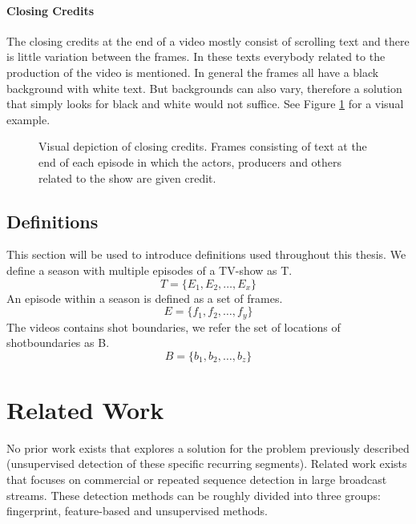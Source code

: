 \documentclass{report}
\begin{document}
\subsubsection{Closing Credits}
The closing credits at the end of a video mostly consist of scrolling text and there is little variation between the frames. In these texts everybody related to the production of the video is mentioned. In general the frames all have a black background with white text. But backgrounds can also vary, therefore a solution that simply looks for black and white would not suffice. See Figure \ref{fig:contextclosingcredits} for a visual example.

\begin{figure}[H]
	\caption{Visual depiction of closing credits. Frames consisting of text at the end of each episode in which the actors, producers and others related to the show are given credit.}
	\label{fig:contextclosingcredits}
\end{figure}

\section{Definitions}
This section will be used to introduce definitions used throughout this thesis. We define a season with multiple episodes of a TV-show as T.
\[T = \{E_1, E_2, \dots, E_x\}\]
An episode within a season is defined as a set of frames.
\[E = \{f_1, f_2, \dots, f_y\}\]
The videos contains shot boundaries, we refer the set of locations of shotboundaries as B.
\[B = \{b_1, b_2, \dots, b_z\}\]

\chapter{Related Work} \label{relatedwork}

No prior work exists that explores a solution for the problem previously described (unsupervised detection of these specific recurring segments). Related work exists that focuses on commercial or repeated sequence detection in large broadcast streams. These detection methods can be roughly divided into three groups: fingerprint, feature-based and unsupervised methods. 
\end{document}
